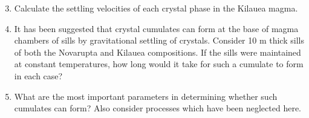 \documentclass[]{book}
\theoremstyle{definition}
\begin{document}
\begin{enumerate}
  \begin{enumerate}
    \setcounter{enumi}{2}
  \item Calculate the settling velocities of each crystal phase in the Kilauea magma.
  \item It has been suggested that crystal cumulates can form at the base of magma chambers of sills by gravitational settling of crystals. Consider 10 m thick sills of both the Novarupta and Kilauea compositions. If the sills were maintained at constant temperatures, how long would it take for such a cumulate to form in each case?
  \item What are the most important parameters in determining whether such cumulates can form? Also consider processes which have been neglected here.
  \end{enumerate}
  
\end{enumerate}
\end{document}
